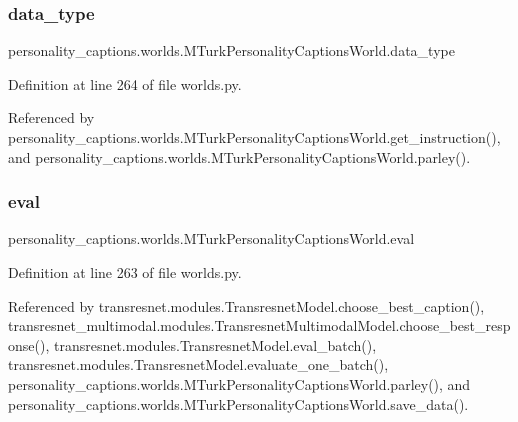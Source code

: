 \mbox{\label{classpersonality__captions_1_1worlds_1_1MTurkPersonalityCaptionsWorld_aef06e94c27b16fcb98b88ade2e4ad2d2}} 
\subsubsection{\texorpdfstring{data\+\_\+type}{data\_type}}
{\footnotesize\ttfamily personality\+\_\+captions.\+worlds.\+M\+Turk\+Personality\+Captions\+World.\+data\+\_\+type}



Definition at line 264 of file worlds.\+py.



Referenced by personality\+\_\+captions.\+worlds.\+M\+Turk\+Personality\+Captions\+World.\+get\+\_\+instruction(), and personality\+\_\+captions.\+worlds.\+M\+Turk\+Personality\+Captions\+World.\+parley().

\mbox{\label{classpersonality__captions_1_1worlds_1_1MTurkPersonalityCaptionsWorld_aaacd5c8739e44cb8991b935eaf8ccec9}} 
\subsubsection{\texorpdfstring{eval}{eval}}
{\footnotesize\ttfamily personality\+\_\+captions.\+worlds.\+M\+Turk\+Personality\+Captions\+World.\+eval}



Definition at line 263 of file worlds.\+py.



Referenced by transresnet.\+modules.\+Transresnet\+Model.\+choose\+\_\+best\+\_\+caption(), transresnet\+\_\+multimodal.\+modules.\+Transresnet\+Multimodal\+Model.\+choose\+\_\+best\+\_\+response(), transresnet.\+modules.\+Transresnet\+Model.\+eval\+\_\+batch(), transresnet.\+modules.\+Transresnet\+Model.\+evaluate\+\_\+one\+\_\+batch(), personality\+\_\+captions.\+worlds.\+M\+Turk\+Personality\+Captions\+World.\+parley(), and personality\+\_\+captions.\+worlds.\+M\+Turk\+Personality\+Captions\+World.\+save\+\_\+data().

